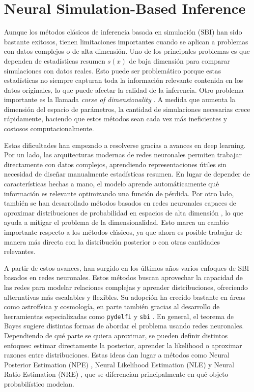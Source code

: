 \section{Neural Simulation-Based Inference}

Aunque los métodos clásicos de inferencia basada en simulación (SBI) han sido bastante exitosos, tienen limitaciones importantes cuando se aplican a problemas con datos complejos o de alta dimensión. Uno de los principales problemas es que dependen de estadísticas resumen $s(x)$ de baja dimensión para comparar simulaciones con datos reales. Esto puede ser problemático porque estas estadísticas no siempre capturan toda la información relevante contenida en los datos originales, lo que puede afectar la calidad de la inferencia. Otro problema importante es la llamada \textit{curse of dimensionality} \cite{prangle2015}. A medida que aumenta la dimensión del espacio de parámetros, la cantidad de simulaciones necesarias crece rápidamente, haciendo que estos métodos sean cada vez más ineficientes y costosos computacionalmente.

Estas dificultades han empezado a resolverse gracias a avances en deep learning. Por un lado, las arquitecturas modernas de redes neuronales permiten trabajar directamente con datos complejos, aprendiendo representaciones útiles sin necesidad de diseñar manualmente estadísticas resumen. En lugar de depender de características hechas a mano, el modelo aprende automáticamente qué información es relevante optimizando una función de pérdida. Por otro lado, también se han desarrollado métodos basados en redes neuronales capaces de aproximar distribuciones de probabilidad en espacios de alta dimensión \cite{papamakarios2021}, lo que ayuda a mitigar el problema de la dimensionalidad. Esto marca un cambio importante respecto a los métodos clásicos, ya que ahora es posible trabajar de manera más directa con la distribución posterior o con otras cantidades relevantes.

A partir de estos avances, han surgido en los últimos años varios enfoques de SBI basados en redes neuronales. Estos métodos buscan aprovechar la capacidad de las redes para modelar relaciones complejas y aprender distribuciones, ofreciendo alternativas más escalables y flexibles. Su adopción ha crecido bastante en áreas como astrofísica y cosmología, en parte también gracias al desarrollo de herramientas especializadas como \texttt{pydelfi} \cite{deistler2025} y \texttt{sbi} \cite{tejero2020}. En general, el teorema de Bayes sugiere distintas formas de abordar el problema usando redes neuronales. Dependiendo de qué parte se quiera aproximar, se pueden definir distintos enfoques: estimar directamente la posterior, aprender la likelihood o aproximar razones entre distribuciones. Estas ideas dan lugar a métodos como Neural Posterior Estimation (NPE) \cite{papamakarios2018fastepsilon,greenberg2019}, Neural Likelihood Estimation (NLE) \cite{papamakarios2019nle,durkan2018} y Neural Ratio Estimation (NRE) \cite{cranmer2016,gutmann2017,hermans2020}, que se diferencian principalmente en qué objeto probabilístico modelan.

